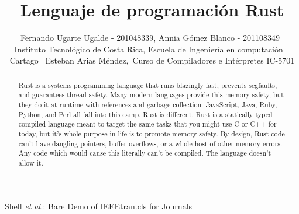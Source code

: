 \documentclass[journal]{IEEEtran}
\begin{document}
%
\title{Lenguaje de programación Rust}




\author{Fernando Ugarte Ugalde - 201048339, Annia Gómez Blanco - 201108349~
        Instituto Tecnológico de Costa Rica, Escuela de Ingeniería en computación ~ Cartago~ Esteban Arias Méndez,~Curso de Compiladores e Intérpretes IC-5701%


}











%
{Shell \MakeLowercase{\textit{et al.}}: Bare Demo of IEEEtran.cls for Journals}





\maketitle

\begin{abstract}

Rust is a systems programming language that runs blazingly fast, prevents segfaults, and guarantees thread safety. Many modern languages provide this memory safety, but they do it at runtime with references and garbage collection. JavaScript, Java, Ruby, Python, and Perl all fall into this camp. Rust is different. Rust is a statically typed compiled language meant to target the same tasks that you might use C or C++ for today, but it's whole purpose in life is to promote memory safety. By design, Rust code can't have dangling pointers, buffer overflows, or a whole host of other memory errors. Any code which would cause this literally can't be compiled. The language doesn't allow it.


\end{abstract}
\end{document}
